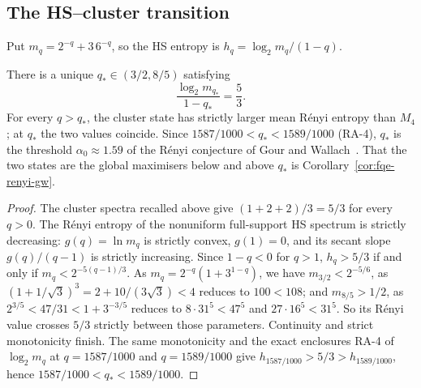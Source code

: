 \subsection{The HS--cluster transition}
Put $m_q=2^{-q}+3\,6^{-q}$, so the HS entropy is $h_q=\log_2m_q/(1-q)$.

\begin{proposition}
\label{prop:fqe-renyi-crossing}
There is a unique $q_*\in(3/2,8/5)$ satisfying
\[
\frac{\log_2 m_{q_*}}{1-q_*}=\frac53.
\]
For every $q>q_*$, the cluster state has strictly larger mean R\'enyi entropy
than $M_4$; at $q_*$ the two values coincide. Since $1587/1000<q_*<1589/1000$ (RA-4), $q_*$ is the
threshold $\alpha_0\approx1.59$ of the R\'enyi conjecture of Gour and Wallach~\cite[Fig.~2]{GW}. That the two states are the global maximisers below and above $q_*$ is
Corollary~\ref{cor:fqe-renyi-gw}.
\end{proposition}
\begin{proof}
The cluster spectra recalled above give $(1+2+2)/3=5/3$ for every $q>0$.
The R\'enyi entropy of the nonuniform full-support HS spectrum is strictly
decreasing: $g(q)=\ln m_q$ is strictly convex, $g(1)=0$, and its secant slope
$g(q)/(q-1)$ is strictly increasing. Since $1-q<0$ for $q>1$, $h_q>5/3$ if and only if
$m_q<2^{-5(q-1)/3}$. As $m_q=2^{-q}(1+3^{1-q})$, we have
$m_{3/2}<2^{-5/6}$, as $(1+1/\sqrt3)^3=2+10/(3\sqrt3)<4$ reduces to $100<108$; and $m_{8/5}>1/2$, as
$2^{3/5}<47/31<1+3^{-3/5}$ reduces to $8\cdot31^5<47^5$ and $27\cdot16^5<31^5$. So its R\'enyi value crosses $5/3$
strictly between those parameters. Continuity and strict monotonicity finish.
The same monotonicity and the exact enclosures RA-4 of $\log_2m_q$ at $q=1587/1000$ and
$q=1589/1000$ give $h_{1587/1000}>5/3>h_{1589/1000}$, hence $1587/1000<q_*<1589/1000$.
\end{proof}

